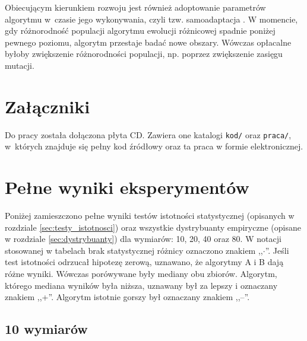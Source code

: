 \documentclass[a4paper,onecolumn,oneside,12pt,wide,floatssmall]{mwrep}
\theoremstyle{definition}
\theoremstyle{plain}%
\theoremstyle{remark}
\begin{document}
Obiecującym kierunkiem rozwoju jest również adoptowanie parametrów algorytmu w~czasie
jego wykonywania, czyli tzw. samoadaptacja \cite{brest}. W momencie, gdy różnorodność populacji
algorytmu ewolucji różnicowej spadnie poniżej pewnego poziomu, algorytm przestaje badać nowe obszary.
Wówczas opłacalne byłoby zwiększenie różnorodności populacji, np. poprzez zwiększenie zasięgu mutacji.

\appendix

\chapter{Załączniki}

Do pracy została dołączona płyta CD. Zawiera one katalogi \texttt{kod/} oraz \texttt{praca/},
w~których znajduje się pełny kod źródłowy oraz ta praca w formie elektronicznej.

\chapter{Pełne wyniki eksperymentów}

Poniżej zamieszczono pełne wyniki testów istotności statystycznej (opisanych w rozdziale 
\ref{sec:testy_istotnosci}) oraz wszystkie
dystrybuanty empiryczne (opisane w rozdziale \ref{sec:dystrybuanty})
dla wymiarów: 10, 20, 40 oraz 80.
W notacji stosowanej w tabelach brak statystycznej różnicy oznaczono znakiem ,,$\cdotp$''.
Jeśli test istotności
odrzucał hipotezę zerową, uznawano, że algorytmy A i B dają różne wyniki.
Wówczas porówywane były mediany obu zbiorów. Algorytm, którego mediana wyników była niższa,
uznawany był za lepszy i oznaczany znakiem ,,+''. Algorytm istotnie gorszy był oznaczany znakiem ,,--''.

\section{10 wymiarów}
\end{document}
